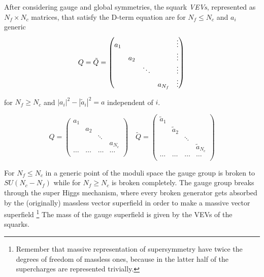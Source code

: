After considering gauge and global symmetries, the squark \emph{VEVs}, represented as $N_f \times N_c$ matrices, that satisfy the D-term equation are for  $N_f \le N_c$ and $a_i$ generic
\begin{equation}
Q = \tilde{Q} = 
\begin{pmatrix}
 a_1 & 		&	 &	 & \vdots \\
	 & a_2  & 	 & 	 & \vdots \\  	
 	 & 		&	\ddots &	 &\vdots  \\
	 &  & 	 & 	a_{N_f}  & \vdots
\end{pmatrix} 
 \\
\end{equation}

for $N_f \geq N_c$ and $ | a_i|^2 - | \tilde{a}_i |^2 = a $ independent of $i$.

\begin{equation}
Q  = 
\begin{pmatrix} 
	 a_1 & 		&	 &	  \\
	 & a_2  & 	 & 	 \\  	
 	 & 		&	\ddots &	   \\
	 &  & 	 & 	a_{N_c}  \\
	 \dots & \dots & \dots & \dots\\ 
\end{pmatrix} 
\quad
\tilde{Q} = 
\begin{pmatrix}
 \tilde{a}_1 & 		&	 &	  \\
	 & \tilde{a}_2  & 	 & 	 \\  	
 	 & 		&	\ddots &	   \\
	 &  & 	 & 	\tilde{a}_{N_c}  \\
	 \dots & \dots & \dots & \dots\\ 
\end{pmatrix} 
\end{equation}


For $N_f \le N_c$ in a generic point of the moduli space the gauge group is broken to $SU(N_c - N_f)$ while for $N_f \geq N_c$ is broken completely.
The gauge group breaks through the super Higgs mechanism, where every broken generator gets absorbed by the (originally) massless vector superfield in order to make a massive vector superfield \footnote{Remember that massive representation of supersymmetry have twice the degrees of freedom of massless ones, because in the latter half of the supercharges are represented trivially.}
The mass of the gauge superfield is given by the VEVs of the squarks.

